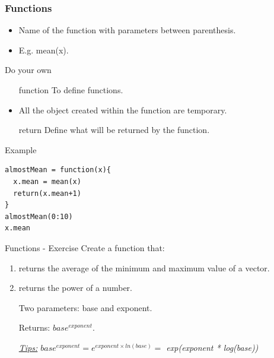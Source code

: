 \documentclass[10pt]{beamer}
\newenvironment{xframe}[2][]
  {\begin{frame}[fragile,environment=xframe,#1]
  \frametitle{#2}}
  {\end{frame}}
\begin{document}
\begin{xframe}{Functions}
  \begin{block}{}
    \begin{itemize}
    \item Name of the function with parameters between parenthesis.
    \item E.g. {\sf mean(x)}.
    \end{itemize}
  \end{block}
  \begin{block}{Do your own}
    \begin{itemize}
      \item[function] To define functions.
      \item All the object created within the function are temporary.
      \item[return] Define what will be returned by the function. 
    \end{itemize}
  \end{block}
  \begin{exampleblock}{Example}
\begin{verbatim}
almostMean = function(x){
  x.mean = mean(x)
  return(x.mean+1)
}
almostMean(0:10)
x.mean
\end{verbatim}
  \end{exampleblock}
\end{xframe}


\begin{frame}{Functions - Exercise}
  Create a function that: 
  \begin{enumerate}
  \item returns the average of the minimum and maximum value of a vector.
  \item returns the power of a number. 
    
    Two parameters: {\sf base} and {\sf exponent}. 
    
    Returns: $base^{exponent}$.
    \medskip
    
    {\tiny\it \uline{Tips:}   $base^{exponent} = e^{exponent \times ln(base)} = $ {\sf exp(exponent * log(base))} }
  \end{enumerate}
\end{frame}
\end{document}
